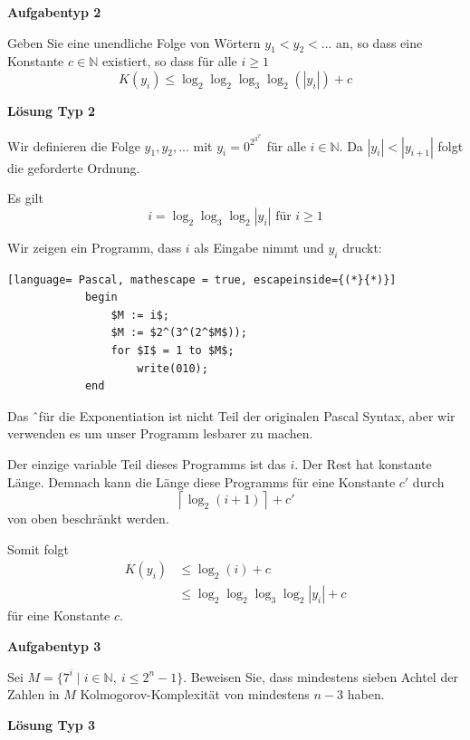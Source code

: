 \documentclass[a4paper, 11pt]{article}
\def\N{\mathbb{N}}
\begin{document}
    \vspace*{1cm}
    
        \textbf{Aufgabentyp 2}

        Geben Sie eine unendliche Folge von Wörtern $y_1 < y_2 < ...$ an, so dass eine Konstante $c \in \N$ existiert, so dass für alle $i \geq 1$ 
        $$K(y_i) \leq \log_2\log_2\log_3\log_2(|y_i|) + c$$

        \textbf{Lösung Typ 2}
        
        Wir definieren die Folge $y_1,y_2,...$ mit $y_i = 0^{2^{3^{2^i}}}$ für alle $i \in \N$. Da $|y_i| < |y_{i+1}|$ folgt die geforderte Ordnung.
    
        Es gilt
        $$i = \log_2\log_3\log_2|y_i|  \text{ für } i \geq 1$$
    
        Wir zeigen ein Programm, dass $i$ als Eingabe nimmt und $y_i$ druckt:
    
        \begin{lstlisting}[language= Pascal, mathescape = true, escapeinside={(*}{*)}]
            begin
                $M := i$;
                $M := $2^(3^(2^$M$));
                for $I$ = 1 to $M$;
                    write(010);
            end
        \end{lstlisting}
        Das \^ \ für die Exponentiation ist nicht Teil der originalen Pascal Syntax, aber wir verwenden es um unser Programm lesbarer zu machen.
    
        Der einzige variable Teil dieses Programms ist das $i$. Der Rest hat konstante Länge. Demnach kann die Länge diese Programms für eine Konstante $c'$ durch 
        $$\left\lceil\log_2(i+1)\right\rceil + c'$$
        von oben beschränkt werden.
    
        Somit folgt
        \begin{align*}
            K(y_i) &\leq \log_2(i) + c\\
            &\leq \log_2\log_2\log_3\log_2|y_i| + c
        \end{align*}
        für eine Konstante $c$. 
    
    \vspace*{1cm}
    
        \textbf{Aufgabentyp 3}

        Sei $M = \{7^i \mid i \in \N, \ i \leq 2^n-1\}$. Beweisen Sie, dass mindestens sieben Achtel der Zahlen in $M$ Kolmogorov-Komplexität von mindestens $n-3$ haben.
    
        \textbf{Lösung Typ 3}
\end{document}
